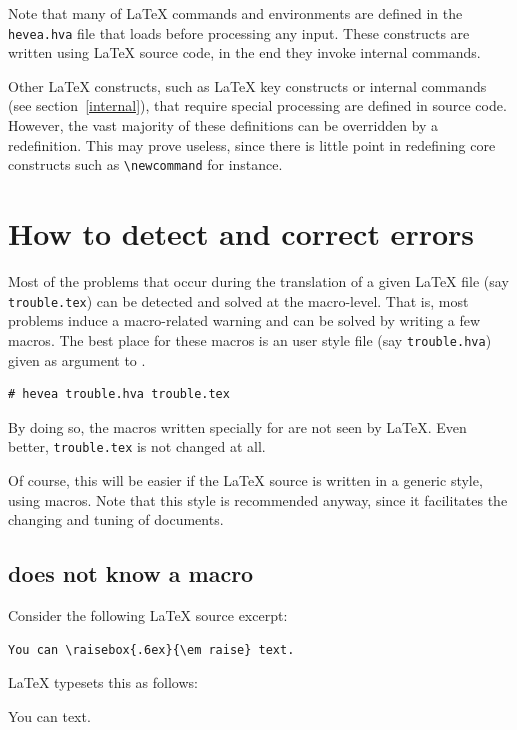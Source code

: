 Note that many of \LaTeX{} commands and environments are defined in the 
\texttt{hevea.hva} file that \hevea{} loads before processing any
input.
These constructs are written using \LaTeX{} source code, in the end they
invoke \hevea{} internal commands.


Other \LaTeX{} constructs, such as
\LaTeX{} key constructs or \hevea{} internal commands (see section~\ref{internal}),
that require special processing are defined
in \hevea{} source code.
However, the vast majority of these definitions can be overridden by a
redefinition.
This may prove useless, since there is little point in
redefining core constructs such as \verb+\newcommand+ for instance.

\section{How to detect and correct errors}\label{trouble}

Most of the problems that occur during the translation of a given
\LaTeX{} file (say \verb+trouble.tex+) can be detected and solved at
the macro-level. That is, most problems induce a macro-related warning
and can be solved by writing a few
macros. The best place for these macros is an user style file (say
\texttt{trouble.hva}) given as
argument to \hevea.
\begin{verbatim}
# hevea trouble.hva trouble.tex
\end{verbatim}
By doing so, the macros written specially for \hevea{} are not
seen by \LaTeX. Even better, \verb+trouble.tex+ is not changed
at all.

Of course, this will be easier if the \LaTeX{} source is written in a
generic style, using macros.
Note that this style is recommended anyway, since it facilitates the changing
and tuning of documents.

\subsection{\hevea{} does not know a macro}\label{dontknow}
Consider the following \LaTeX{} source excerpt:
\begin{verbatim}
You can \raisebox{.6ex}{\em raise} text.
\end{verbatim}

\LaTeX{} typesets this as follows:
\begin{htmlout}
\begin{showlatex}
You can  text.
\end{showlatex}
\end{htmlout}

